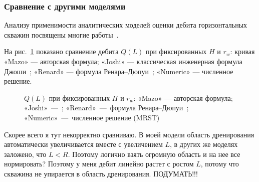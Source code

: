 \documentclass{article}
\begin{document}
\subsubsection{Сравнение с другими моделями}
Анализу применимости аналитических моделей оценки дебита горизонтальных скважин посвящены многие 
работы~\cite{lit:kham_shubin2018,lit:kham_nasybullin2023}.

На рис.~\ref{fig:kham_compare_hw_mrst} показано сравнение дебита $Q(L)$ при фиксированных $H$ и $r_w$:
кривая «Mazo» — авторская формула; «Joshi» — классическая инженерная формула Джоши~\cite{lit:kham_joshi1988};
«Renard» — формула Ренара–Дюпуи~\cite{lit:kham_renard_dupuy1991}; «Numeric» — численное решение.
\begin{figure}[H]
	\centering
	
	\caption{$Q(L)$ при фиксированных $H$ и $r_w$: «Mazo» — авторская формула; «Joshi»~---~\cite{lit:kham_joshi1988}; 
	«Renard»~---~формула Ренара–Дюпуи~\cite{lit:kham_renard_dupuy1991}; «Numeric»~---~численное решение (MRST)}
	\label{fig:kham_compare_hw_mrst}
\end{figure}

{\color{red} Скорее всего я тут некорректно сравниваю. В моей модели область дренирования автоматически увеличивается вместе с увеличением 
$L$, в других же моделях заложено, что $L < R$. Поэтому логично взять огромную область и на нее все нормировать? 
Поэтому у меня дебит линейно растет с ростом $L$, потому что скважина не упирается в область дренирования. ПОДУМАТЬ!!!}


\end{document}
